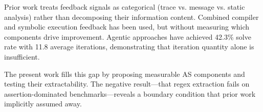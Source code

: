 Prior work treats feedback signals as categorical (trace vs. message vs. static analysis) rather than decomposing their information content. Combined compiler and symbolic execution feedback has been used, but without measuring which components drive improvement. Agentic approaches have achieved 42.3\% solve rate with 11.8 average iterations, demonstrating that iteration quantity alone is insufficient.

The present work fills this gap by proposing measurable AS components and testing their extractability. The negative result---that regex extraction fails on assertion-dominated benchmarks---reveals a boundary condition that prior work implicitly assumed away.

